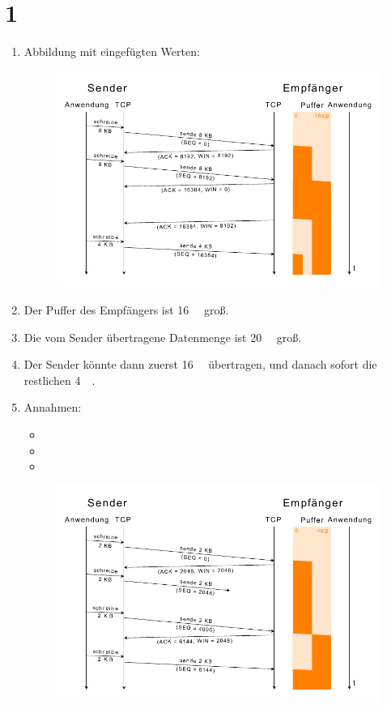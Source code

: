 \documentclass[ngerman]{scrartcl}
\begin{document}
\section*{1}
	\begin{enumerate}[label=\alph*)]
    \item
    Abbildung mit eingefügten Werten:

    \begin{figure}[ht]
      \centering
      \includegraphics{uebung6-1a.pdf}
    \end{figure}

    \item
    Der Puffer des Empfängers ist \SI{16}{\kilo\byte} groß.

    \item
    Die vom Sender übertragene Datenmenge ist \SI{20}{\kilo\byte} groß.

    \item
    Der Sender könnte dann zuerst \SI{16}{\kilo\byte} übertragen, und danach sofort die restlichen \SI{4}{\kilo\byte}.

    \newpage

    \item
    Annahmen:
      \begin{itemize}
        \item
        \item
        \item
      \end{itemize}

    \begin{figure}[ht]
      \centering
      \includegraphics{uebung6-1e.pdf}
    \end{figure}
  \end{enumerate}
\end{document}
